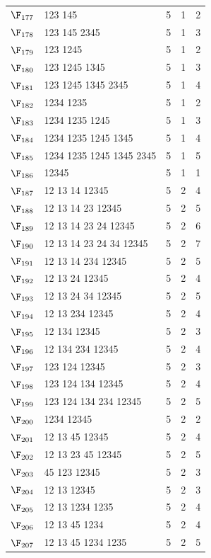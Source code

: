 {\begin{longtable}{c p{7cm} c c c}
$\F_{177}$ & 123 145 & 5 & 1 & 2 \\
$\F_{178}$ & 123 145 2345 & 5 & 1 & 3 \\
$\F_{179}$ & 123 1245 & 5 & 1 & 2 \\
$\F_{180}$ & 123 1245 1345 & 5 & 1 & 3 \\
$\F_{181}$ & 123 1245 1345 2345 & 5 & 1 & 4 \\
$\F_{182}$ & 1234 1235 & 5 & 1 & 2 \\
$\F_{183}$ & 1234 1235 1245 & 5 & 1 & 3 \\
$\F_{184}$ & 1234 1235 1245 1345 & 5 & 1 & 4 \\
$\F_{185}$ & 1234 1235 1245 1345 2345 & 5 & 1 & 5 \\
$\F_{186}$ & 12345 & 5 & 1 & 1 \\
\midrule
$\F_{187}$ & 12 13 14 12345 & 5 & 2 & 4 \\
$\F_{188}$ & 12 13 14 23 12345 & 5 & 2 & 5 \\
$\F_{189}$ & 12 13 14 23 24 12345 & 5 & 2 & 6 \\
$\F_{190}$ & 12 13 14 23 24 34 12345 & 5 & 2 & 7 \\
$\F_{191}$ & 12 13 14 234 12345 & 5 & 2 & 5 \\
$\F_{192}$ & 12 13 24 12345 & 5 & 2 & 4 \\
$\F_{193}$ & 12 13 24 34 12345 & 5 & 2 & 5 \\
$\F_{194}$ & 12 13 234 12345 & 5 & 2 & 4 \\
$\F_{195}$ & 12 134 12345 & 5 & 2 & 3 \\
$\F_{196}$ & 12 134 234 12345 & 5 & 2 & 4 \\
$\F_{197}$ & 123 124 12345 & 5 & 2 & 3 \\
$\F_{198}$ & 123 124 134 12345 & 5 & 2 & 4 \\
$\F_{199}$ & 123 124 134 234 12345 & 5 & 2 & 5 \\
$\F_{200}$ & 1234 12345 & 5 & 2 & 2 \\
$\F_{201}$ & 12 13 45 12345 & 5 & 2 & 4 \\
$\F_{202}$ & 12 13 23 45 12345 & 5 & 2 & 5 \\
$\F_{203}$ & 45 123 12345 & 5 & 2 & 3 \\
$\F_{204}$ & 12 13 12345 & 5 & 2 & 3 \\
$\F_{205}$ & 12 13 1234 1235 & 5 & 2 & 4 \\
$\F_{206}$ & 12 13 45 1234 & 5 & 2 & 4 \\
$\F_{207}$ & 12 13 45 1234 1235 & 5 & 2 & 5 \\

\end{longtable}}
